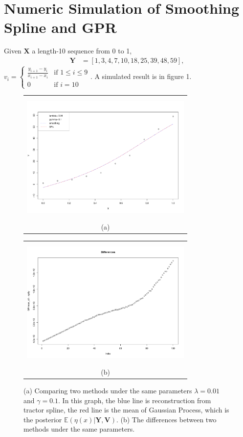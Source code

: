 \section{Numeric Simulation of Smoothing Spline and GPR}
Given $\mathbf{X}$ a length-10 sequence from 0 to 1, 
\begin{align*}
\mathbf{Y}&=\left[1,3,4,7,10,18,25,39,48,59 \right],
\end{align*}
$v_i=\begin{cases}
\frac{y_{i+1}-y_i}{x_{i+1}-x_i}&\mbox{if } 1\leq i \leq 9\\
0 & \mbox{if } i=10
\end{cases}$. 
A simulated result is in figure 1.
\begin{figure}[!htb]  
	\centering
	\begin{tabular}{c}
		\includegraphics[width=8.5cm,height=6.5cm]{Chapters/2.TractorSplineTheory/plot/simu01} \\[\abovecaptionskip]
		\small (a) 
	\end{tabular}
	\begin{tabular}{c}
		\includegraphics[width=8.5cm,height=6.5cm]{Chapters/2.TractorSplineTheory/plot/simu02} \\[\abovecaptionskip]
		\small (b) 
	\end{tabular}
	\caption{(a) Comparing two methods under the same parameters $\lambda=0.01$ and $\gamma=0.1$. In this graph, the blue line is reconstruction from tractor spline, the red line is the mean of Gaussian Process, which is the posterior $\mathbb{E}(\eta(x) | \mathbf{Y}, \mathbf{V})$. (b) The differences between two methods under the same parameters.}
\end{figure}

